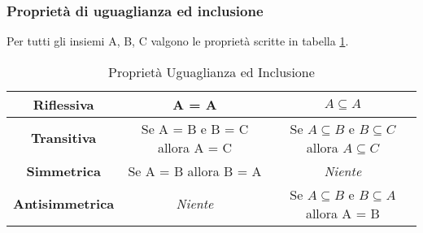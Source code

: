\subsubsection{Proprietà di uguaglianza ed inclusione}
Per tutti gli insiemi A, B, C valgono le proprietà scritte in tabella \ref{tab:proprietà-uguaglianza-inclusione}.
\begin{table}[h!]
    \vspace{10pt}
    \centering
    \setlength{\tabcolsep}{7pt}
    \renewcommand{\arraystretch}{2.5}
    \begin{tabular}{|c|c|c|}
        \hline
        \textbf{Riflessiva} & A = A & $A \subseteq A$ \\ \hline
        \textbf{Transitiva} & Se A = B e B = C allora A = C & Se $A \subseteq B$ e $B \subseteq C$ allora  $A \subseteq C$\\ \hline
        \textbf{Simmetrica} & Se A = B allora B = A & \textit{Niente} \\ \hline
        \textbf{Antisimmetrica} & \textit{Niente} & Se $A \subseteq B$ e $B \subseteq A$ allora A = B \\
        \hline
    \end{tabular}
    \caption{Proprietà Uguaglianza ed Inclusione}
    \label{tab:proprietà-uguaglianza-inclusione}
\end{table}

\newpage
